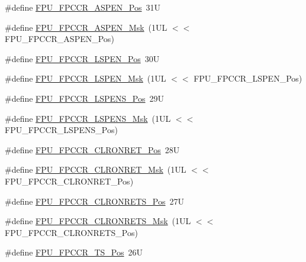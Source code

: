 \begin{DoxyCompactItemize}
\item 
\#define \hyperlink{group___c_m_s_i_s___f_p_u_ga4228a923ddf665f868e56b4b9e9bff7b}{F\+P\+U\+\_\+\+F\+P\+C\+C\+R\+\_\+\+A\+S\+P\+E\+N\+\_\+\+Pos}~31U
\item 
\#define \hyperlink{group___c_m_s_i_s___f_p_u_ga309886ff6bbd25cb13c061c6683c6c0c}{F\+P\+U\+\_\+\+F\+P\+C\+C\+R\+\_\+\+A\+S\+P\+E\+N\+\_\+\+Msk}~(1\+U\+L $<$$<$ F\+P\+U\+\_\+\+F\+P\+C\+C\+R\+\_\+\+A\+S\+P\+E\+N\+\_\+\+Pos)
\item 
\#define \hyperlink{group___c_m_s_i_s___f_p_u_gac7d70e051fe759ad8fed83bf5b5aebc1}{F\+P\+U\+\_\+\+F\+P\+C\+C\+R\+\_\+\+L\+S\+P\+E\+N\+\_\+\+Pos}~30U
\item 
\#define \hyperlink{group___c_m_s_i_s___f_p_u_gaf4ab19de45df6522dd882bc116f938e9}{F\+P\+U\+\_\+\+F\+P\+C\+C\+R\+\_\+\+L\+S\+P\+E\+N\+\_\+\+Msk}~(1\+U\+L $<$$<$ F\+P\+U\+\_\+\+F\+P\+C\+C\+R\+\_\+\+L\+S\+P\+E\+N\+\_\+\+Pos)
\item 
\#define \hyperlink{group___c_m_s_i_s___f_p_u_ga705368bf3c52b5bb4edfbcb3e2631e1c}{F\+P\+U\+\_\+\+F\+P\+C\+C\+R\+\_\+\+L\+S\+P\+E\+N\+S\+\_\+\+Pos}~29U
\item 
\#define \hyperlink{group___c_m_s_i_s___f_p_u_ga73afcf0fe09c69e9625e11035cabb1c0}{F\+P\+U\+\_\+\+F\+P\+C\+C\+R\+\_\+\+L\+S\+P\+E\+N\+S\+\_\+\+Msk}~(1\+U\+L $<$$<$ F\+P\+U\+\_\+\+F\+P\+C\+C\+R\+\_\+\+L\+S\+P\+E\+N\+S\+\_\+\+Pos)
\item 
\#define \hyperlink{group___c_m_s_i_s___f_p_u_ga0b97b2fdac794f4fddab1e4342e0c104}{F\+P\+U\+\_\+\+F\+P\+C\+C\+R\+\_\+\+C\+L\+R\+O\+N\+R\+E\+T\+\_\+\+Pos}~28U
\item 
\#define \hyperlink{group___c_m_s_i_s___f_p_u_gadedc12ec237657721a613c6f47abed6f}{F\+P\+U\+\_\+\+F\+P\+C\+C\+R\+\_\+\+C\+L\+R\+O\+N\+R\+E\+T\+\_\+\+Msk}~(1\+U\+L $<$$<$ F\+P\+U\+\_\+\+F\+P\+C\+C\+R\+\_\+\+C\+L\+R\+O\+N\+R\+E\+T\+\_\+\+Pos)
\item 
\#define \hyperlink{group___c_m_s_i_s___f_p_u_gabb18ccf9d1b0a4bef3b0823f18eb96ba}{F\+P\+U\+\_\+\+F\+P\+C\+C\+R\+\_\+\+C\+L\+R\+O\+N\+R\+E\+T\+S\+\_\+\+Pos}~27U
\item 
\#define \hyperlink{group___c_m_s_i_s___f_p_u_ga103d932807c15250d96711952878eeb2}{F\+P\+U\+\_\+\+F\+P\+C\+C\+R\+\_\+\+C\+L\+R\+O\+N\+R\+E\+T\+S\+\_\+\+Msk}~(1\+U\+L $<$$<$ F\+P\+U\+\_\+\+F\+P\+C\+C\+R\+\_\+\+C\+L\+R\+O\+N\+R\+E\+T\+S\+\_\+\+Pos)
\item 
\#define \hyperlink{group___c_m_s_i_s___f_p_u_ga624474f408fde177df519460775a74a1}{F\+P\+U\+\_\+\+F\+P\+C\+C\+R\+\_\+\+T\+S\+\_\+\+Pos}~26U
\item 
$$
\end{DoxyCompactItemize}
